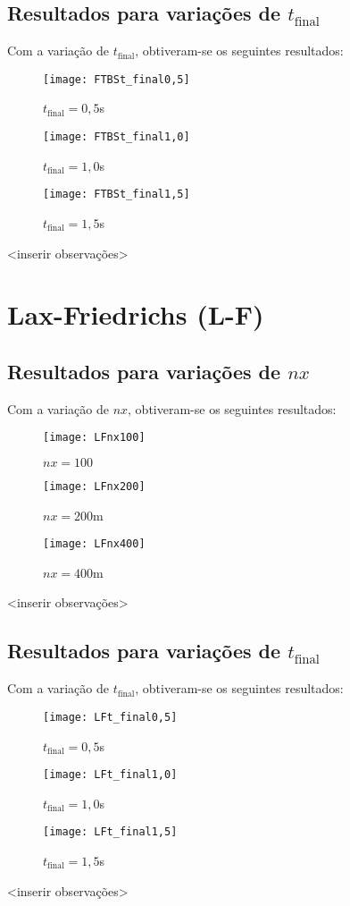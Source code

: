 \subsection{Resultados para variações de $t_{\text{final}}$}
Com a variação de $t_{\text{final}}$, obtiveram-se os seguintes resultados:
\begin{figure}[H]
    \centering
    \texttt{[image: FTBSt\_final0,5]}
    \caption{$t_{\text{final}} = 0,5$s}
\end{figure}
\begin{figure}[H]
    \centering
    \texttt{[image: FTBSt\_final1,0]}
    \caption{$t_{\text{final}} = 1,0$s}
\end{figure}
\begin{figure}[H]
    \centering
    \texttt{[image: FTBSt\_final1,5]}
    \caption{$t_{\text{final}} = 1,5$s}
\end{figure}
<inserir observações>

\section{Lax-Friedrichs (L-F)}

\subsection{Resultados para variações de $nx$}
Com a variação de $nx$, obtiveram-se os seguintes resultados:
\begin{figure}[H]
    \centering
    \texttt{[image: LFnx100]}
    \caption{$nx = 100$}
\end{figure}
\begin{figure}[H]
    \centering
    \texttt{[image: LFnx200]}
    \caption{$nx = 200$m}
\end{figure}
\begin{figure}[H]
    \centering
    \texttt{[image: LFnx400]}
    \caption{$nx = 400$m}
\end{figure}
<inserir observações>

\subsection{Resultados para variações de $t_{\text{final}}$}
Com a variação de $t_{\text{final}}$, obtiveram-se os seguintes resultados:
\begin{figure}[H]
    \centering
    \texttt{[image: LFt\_final0,5]}
    \caption{$t_{\text{final}} = 0,5$s}
\end{figure}
\begin{figure}[H]
    \centering
    \texttt{[image: LFt\_final1,0]}
    \caption{$t_{\text{final}} = 1,0$s}
\end{figure}
\begin{figure}[H]
    \centering
    \texttt{[image: LFt\_final1,5]}
    \caption{$t_{\text{final}} = 1,5$s}
\end{figure}
<inserir observações>

